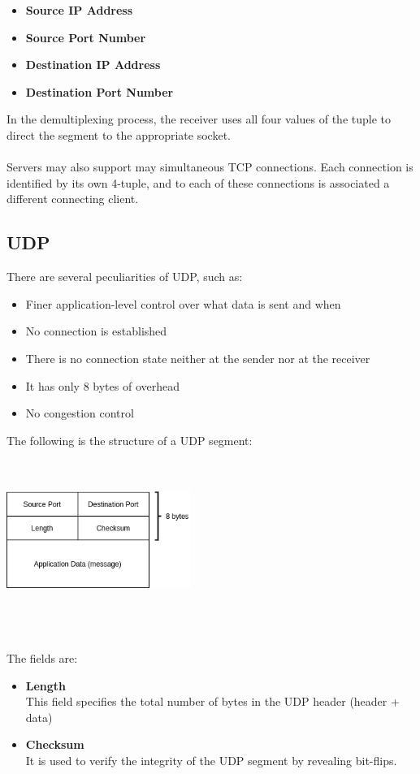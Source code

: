 \documentclass{article}
\begin{document}
\begin{itemize}
	\item \textbf{Source IP Address}
	\item \textbf{Source Port Number}
	\item \textbf{Destination IP Address}
	\item \textbf{Destination Port Number}
\end{itemize}
In the demultiplexing process, the receiver uses all four values of the tuple to direct the segment to the appropriate socket. \\ \\
Servers may also support may simultaneous TCP connections. Each connection is identified by its own 4-tuple, and to each of these connections is associated a different connecting client.

\subsection{UDP}
There are several peculiarities of UDP, such as:

\begin{itemize}
	\item Finer application-level control over what data is sent and when
	\item No connection is established
	\item There is no connection state neither at the sender nor at the receiver
	\item It has only 8 bytes of overhead
	\item No congestion control
\end{itemize}
The following is the structure of a UDP segment: \\ \\ \\
\centerline{\includegraphics[width=6cm]{./assets/udp.png}} \\ \\ \\
The fields are:

\begin{itemize}
	\item \textbf{Length}
	\vspace{.2cm} \\
	This field specifies the total number of bytes in the UDP header (header + data)
	\item \textbf{Checksum}
	\vspace{.2cm} \\
	It is used to verify the integrity of the UDP segment by revealing bit-flips.
\end{itemize}
\end{document}
